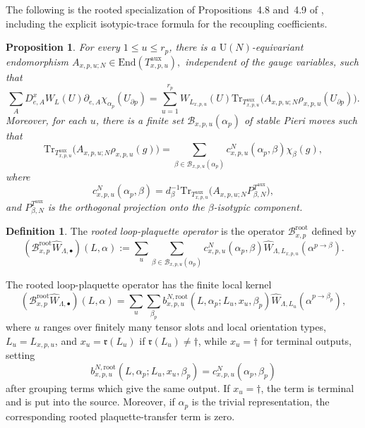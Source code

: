 \documentclass[11pt,a4paper,reqno]{amsart}
\newtheorem{proposition}[theorem]{Proposition}
\theoremstyle{definition}
\newtheorem{definition}[theorem]{Definition}
\theoremstyle{remark}
\newcommand\U{{\mathrm U}}
\newcommand\Tr{{\mathrm{Tr}}}
\newcommand\End{{\mathrm{End}}}
\begin{document}
The following is the rooted specialization of Propositions~4.8 and~4.9 of \cite{Lem26a}, including the explicit isotypic-trace formula for the recoupling coefficients.

\begin{proposition}\label{prop:rooted-local-incidence-recoupling}
For every $1\le u\le r_p$, there is a $\U(N)$-equivariant endomorphism $A_{x,p,u;N}\in\End(T^{\mathrm{aux}}_{x,p,u}),$ independent of the gauge variables, such that
\[
\sum_A D^x_{e,A}W_L(U) \partial_{e,A}\chi_{\alpha_p}(U_{\partial p})
=
\sum_{u=1}^{r_p}
W_{L_{x,p,u}}(U)
\Tr_{T^{\mathrm{aux}}_{x,p,u}}
\bigl(A_{x,p,u;N}\rho_{x,p,u}(U_{\partial p})\bigr).
\]
Moreover, for each $u$, there is a finite set $\mathcal B_{x,p,u}(\alpha_p)$ of stable Pieri moves such that
\begin{equation}\label{eq:rooted-pieri-character-expansion}
\Tr_{T^{\mathrm{aux}}_{x,p,u}}\bigl(A_{x,p,u;N}\rho_{x,p,u}(g)\bigr)=\sum_{\beta\in\mathcal B_{x,p,u}(\alpha_p)}c^N_{x,p,u}(\alpha_p,\beta)\chi_\beta(g),
\end{equation}
where
\begin{equation}\label{eq:rooted-pieri-coefficient}
c^N_{x,p,u}(\alpha_p,\beta)
=
d_\beta^{-1}
\Tr_{T^{\mathrm{aux}}_{x,p,u}}
\bigl(A_{x,p,u;N}P^{T^{\mathrm{aux}}}_{\beta,N}\bigr),
\end{equation}
and $P^{T^{\mathrm{aux}}}_{\beta,N}$ is the orthogonal projection onto the $\beta$-isotypic component.
\end{proposition}

\begin{definition}
The \emph{rooted loop-plaquette operator} is the operator $\mathscr B_{x,p}^{\mathrm{root}}$ defined by
\begin{equation}\label{eq:rooted-B-operator}
(\mathscr B^{\mathrm{root}}_{x,p}\widehat W_{\Lambda,\bullet})(L,\alpha):=\sum_u\sum_{\beta\in\mathcal B_{x,p,u}(\alpha_p)}c^N_{x,p,u}(\alpha_p,\beta) \widehat W_{\Lambda,L_{x,p,u}}(\alpha^{p\to\beta}).
\end{equation}
\end{definition}
The rooted loop-plaquette operator has the finite local kernel
\begin{equation}\label{eq:Broot-local-kernel}
(\mathscr B^{\mathrm{root}}_{x,p}\widehat W_{\Lambda,\bullet})(L,\alpha)
=
\sum_u\sum_{\beta_p}
b^{N,\mathrm{root}}_{x,p,u}(L,\alpha_p;L_u,x_u,\beta_p)
\widehat W_{\Lambda,L_u}(\alpha^{p\to\beta_p}),
\end{equation}
where $u$ ranges over finitely many tensor slots and local orientation types, $L_u=L_{x,p,u}$, and $x_u=\mathfrak r(L_u)$ if $\mathfrak r(L_u)\ne\dagger$, while $x_u=\dagger$ for terminal outputs, setting
\[
b^{N,\mathrm{root}}_{x,p,u}(L,\alpha_p;L_u,x_u,\beta_p)=c^N_{x,p,u}(\alpha_p,\beta_p)
\]
after grouping terms which give the same output.  If $x_u=\dagger$, the term is terminal and is put into the source.  Moreover, if $\alpha_p$ is the trivial representation, the corresponding rooted plaquette-transfer term is zero.
\end{document}
